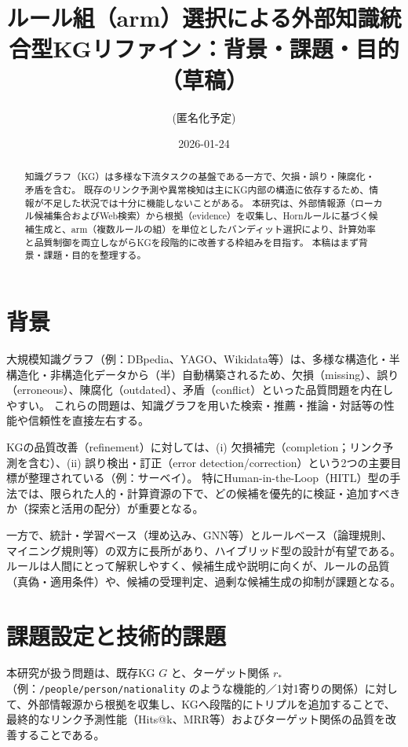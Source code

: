 \documentclass[11pt]{article}
\title{ルール組（arm）選択による外部知識統合型KGリファイン：背景・課題・目的（草稿）}
\author{(匿名化予定)}
\date{2026-01-24}
\begin{document}
\maketitle

\begin{abstract}
知識グラフ（KG）は多様な下流タスクの基盤である一方で、欠損・誤り・陳腐化・矛盾を含む。
既存のリンク予測や異常検知は主にKG内部の構造に依存するため、情報が不足した状況では十分に機能しないことがある。
本研究は、外部情報源（ローカル候補集合およびWeb検索）から根拠（evidence）を収集し、Hornルールに基づく候補生成と、arm（複数ルールの組）を単位としたバンディット選択により、計算効率と品質制御を両立しながらKGを段階的に改善する枠組みを目指す。
本稿はまず背景・課題・目的を整理する。
\end{abstract}

\section{背景}
大規模知識グラフ（例：DBpedia、YAGO、Wikidata等）は、多様な構造化・半構造化・非構造化データから（半）自動構築されるため、欠損（missing）、誤り（erroneous）、陳腐化（outdated）、矛盾（conflict）といった品質問題を内在しやすい。
これらの問題は、知識グラフを用いた検索・推薦・推論・対話等の性能や信頼性を直接左右する。

KGの品質改善（refinement）に対しては、(i) 欠損補完（completion；リンク予測を含む）、(ii) 誤り検出・訂正（error detection/correction）という2つの主要目標が整理されている（例：サーベイ\cite{paulheim_knowledge_2017,xue_knowledge_2022}）。
特にHuman-in-the-Loop（HITL）型の手法では、限られた人的・計算資源の下で、どの候補を優先的に検証・追加すべきか（探索と活用の配分）が重要となる。

一方で、統計・学習ベース（埋め込み、GNN等）とルールベース（論理規則、マイニング規則等）の双方に長所があり、ハイブリッド型の設計が有望である。
ルールは人間にとって解釈しやすく、候補生成や説明に向くが、ルールの品質（真偽・適用条件）や、候補の受理判定、過剰な候補生成の抑制が課題となる。

\section{課題設定と技術的課題}
本研究が扱う問題は、既存KG $G$ と、ターゲット関係 $r_*$（例：\texttt{/people/person/nationality} のような機能的／1対1寄りの関係）に対して、外部情報源から根拠を収集し、KGへ段階的にトリプルを追加することで、最終的なリンク予測性能（Hits@k、MRR等）およびターゲット関係の品質を改善することである。
\end{document}
